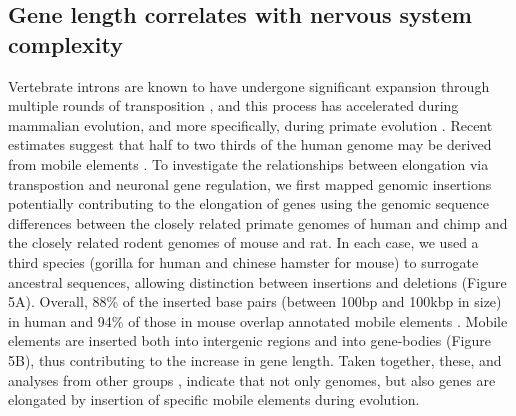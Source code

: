 \subsection{Gene length correlates with nervous system complexity}
Vertebrate introns are known to have undergone significant expansion through multiple rounds of transposition \cite{Grishkevich_2014}, and this process has accelerated during mammalian evolution, and more specifically, during primate evolution \cite{Friedli_2015}. Recent estimates suggest that half to two thirds of the human genome may be derived from mobile elements \cite{Friedli_2015}. %
To investigate the relationships between elongation via transpostion and neuronal gene regulation, we first mapped genomic insertions potentially contributing to the elongation of genes using the genomic sequence differences between the closely related primate genomes of human and chimp and the closely related rodent genomes of mouse and rat. In each case, we used a third species (gorilla for human and chinese hamster for mouse) to surrogate ancestral sequences, allowing distinction between insertions and deletions (Figure 5A). 
Overall, 88\% of the inserted base pairs (between 100bp and 100kbp in size) in human and 94\% of those in mouse overlap annotated mobile elements \cite{Hubley_2015}. Mobile elements are inserted both into intergenic regions and into gene-bodies (Figure 5B), thus contributing to the increase in gene length. 
Taken together, these, and analyses from other groups \citep{Grishkevich_2014,Chimpanzee_2005}, indicate that not only genomes, but also genes are elongated by insertion of specific mobile elements during evolution.


